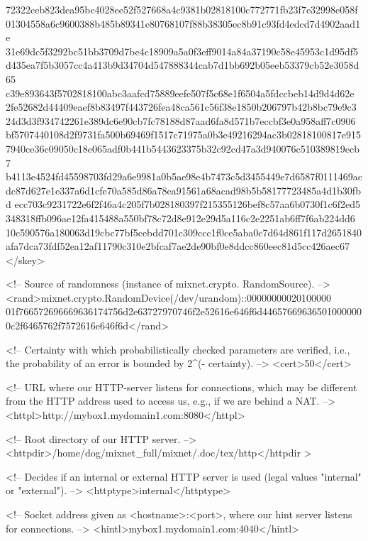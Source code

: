 72322ceb823dea95bc4028ee52f527668a4c9381b02818100c772771fb23f7e32998e058f
01304558a6c9600388b485b89341e80768107f88b38305ec8b91c93fd4edcd7d4902aad1e
31e69dc5f3292bc51bb3709d7be4c18909a5a0f3eff9014a84a37190c58e45953c1d95df5
d435ea7f5b3057cc4a413b9d34704d547888344cab7d1bb692b05eeb53379cb52e3058d65
c39e893643f5702818100abc3aafcd75889eefe507f5c68e1f6504a5fdccbeb14d9d4d62e
2fe52682d44409eaef8b83497f443726fea48ca561c56f38e1850b206797b42b8bc79e9c3
24d3d3f934742261e389dc6e90cb7fc78188d87aad6fa8d571b7eccbf3e0a958aff7c0906
bf5707440108d2f9731fa500b69469f1517c71975a0b3e49216294ac3b02818100817e915
7940ce36c09050c18e065adf0b441b5443623375b32c92cd47a3d940076c510389819ecb7
b4113e4524fd45598703fd29a6e9981a0b5ae98e4b7473c5d3455449e7d6587f0111469ac
dc87d627e1e337a6d1cfe70a585d86a78ea91561a68acad98b5b58177723485a4d1b30fbd
ecc703c9231722e6f2f46a4c205f7b028180397f215355126bef8c57aa6b0730f1c6f2ed5
348318ffb096ae12fa415488a550bf78c72d8e912e29d5a116c2e2251ab6ff7f6ab224dd6
10c590576a180063d19cbc77bf5cebdd701c309ccc1f0ce5aba0c7d64d861f117d2651840
afa7dca73fdf52ea12af11790c310e2bfcaf7ae2de90bf0e8ddcc860eec81d5cc426aec67
</skey>

   <!-- Source of randomness (instance of mixnet.crypto.
        RandomSource). -->
   <rand>mixnet.crypto.RandomDevice(/dev/urandom)::00000000020100000
01f766572696669636174756d2e63727970746f2e52616e646f6d44657669636501000000
0c2f6465762f7572616e646f6d</rand>

   <!-- Certainty with which probabilistically checked parameters are 
        verified, i.e., the probability of an error is bounded by 2^(-
        certainty). -->
   <cert>50</cert>

   <!-- URL where our HTTP-server listens for connections, which may 
        be different from the HTTP address used to access us, e.g., if 
        we are behind a NAT. -->
   <httpl>http://mybox1.mydomain1.com:8080</httpl>

   <!-- Root directory of our HTTP server. -->
   <httpdir>/home/dog/mixnet_full/mixnet/.doc/tex/http</httpdir
>

   <!-- Decides if an internal or external HTTP server is used (legal 
        values "internal" or "external"). -->
   <httptype>internal</httptype>

   <!-- Socket address given as <hostname>:<port>, where our hint 
        server listens for connections. -->
   <hintl>mybox1.mydomain1.com:4040</hintl>

